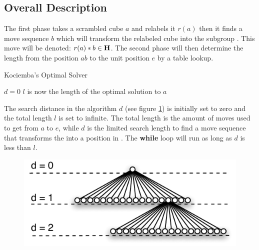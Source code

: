 \subsection{Overall Description}
\label{sub:overallDescription}
The first phase takes a scrambled cube $a$ and relabels it $r(a)$ then it finds a move sequence $b$ which will transform the relabeled cube into the subgroup . This move will be denoted: $r(a)*b \in \textbf{H}$. The second phase will then determine the length from the position $ab$ to the unit position $e$ by a table lookup. 


\begin{algorithm}[!htb]                     
\caption{Kociemba's Optimal Solver \cite{rokicki09}}          
\label{alg:kociemba}        
\begin{algorithmic}[1]
\STATE $d=0$
			\ENDIF
		\ENDIF
	\ENDFOR
\ENDWHILE
\STATE $l$ is now the length of the optimal solution to $a$
\end{algorithmic}
\end{algorithm}

The search distance in the algorithm $d$ (see figure \ref{fig:searchExpansion}) is initially set to zero and the total length $l$ is set to infinite. The total length is the amount of moves used to get from $a$ to $e$, while $d$ is the limited search length to find a move sequence that transforms the \rubik{} into a position in . 
The \textbf{while} loop will run as long as $d$ is less than $l$.
\begin{figure}[!hbt]
	\centering
		\includegraphics[scale=0.75]{input/pics/searchExpansion.pdf}
	\caption{}
	\label{fig:searchExpansion}
\end{figure}

